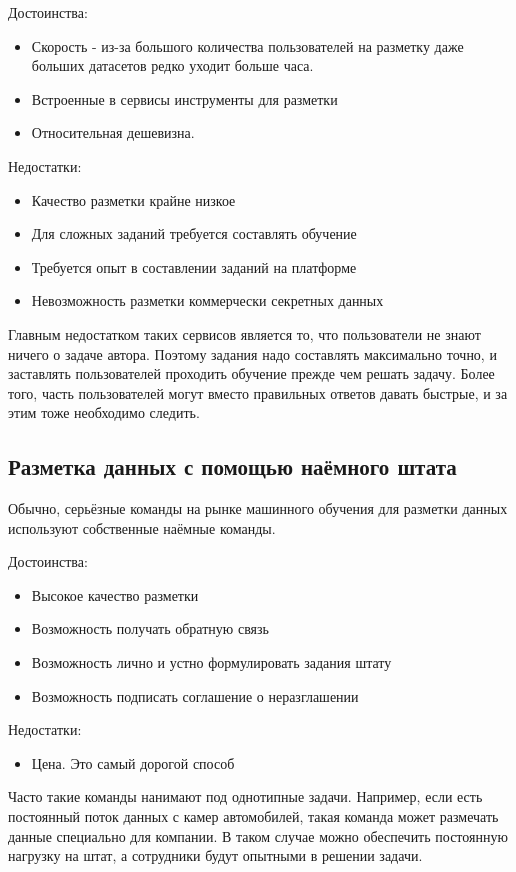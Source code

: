 Достоинства:
\begin{itemize}
    \item Скорость - из-за большого количества пользователей на разметку даже больших датасетов редко уходит больше часа.
    \item Встроенные в сервисы инструменты для разметки
    \item Относительная дешевизна.
\end{itemize}
Недостатки:
\begin{itemize}
    \item Качество разметки крайне низкое
    \item Для сложных заданий требуется составлять обучение
    \item Требуется опыт в составлении заданий на платформе
    \item Невозможность разметки коммерчески секретных данных
\end{itemize}
Главным недостатком таких сервисов является то, что пользователи не знают ничего о задаче автора. Поэтому задания надо составлять максимально точно, и заставлять пользователей проходить обучение прежде чем решать задачу. Более того, часть пользователей могут вместо правильных ответов давать быстрые, и за этим тоже необходимо следить.

\subsection{Разметка данных с помощью наёмного штата} \label{subsect1_4_3}
Обычно, серьёзные команды на рынке машинного обучения для разметки данных используют собственные наёмные команды.

Достоинства:
\begin{itemize}
    \item Высокое качество разметки
    \item Возможность получать обратную связь
    \item Возможность лично и устно формулировать задания штату
    \item Возможность подписать соглашение о неразглашении
\end{itemize}
Недостатки:
\begin{itemize}
    \item Цена. Это самый дорогой способ
\end{itemize}
Часто такие команды нанимают под однотипные задачи. Например, если есть постоянный поток данных с камер автомобилей, такая команда может размечать данные специально для компании. В таком случае можно обеспечить постоянную нагрузку на штат, а сотрудники будут опытными в решении задачи.